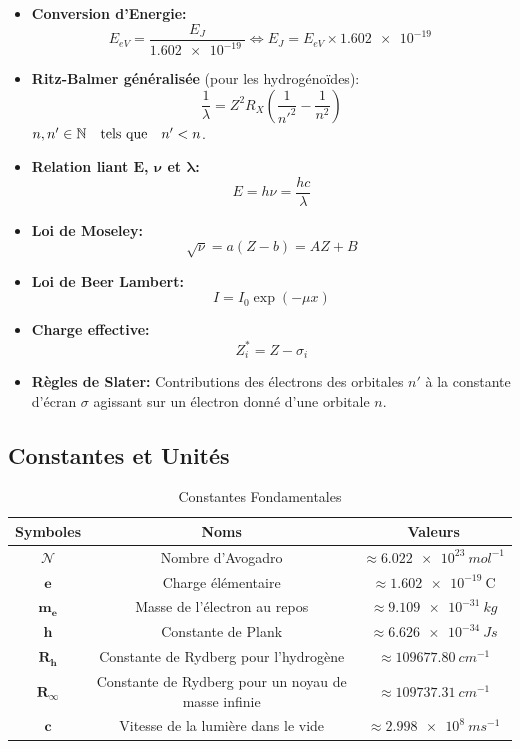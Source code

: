 \documentclass{article}
\begin{document}
\begin{itemize}[label=$\ast$]
    \item \textbf{Conversion d'Energie:}
    $$E_{eV}=\frac{E_J}{\qty{1.602e-19}{}} \Longleftrightarrow E_J=E_{eV}\times \qty{1.602e-19}{}$$

    \item \textbf{Ritz-Balmer généralisée} (pour les hydrogénoïdes):
    $$\frac{1}{\lambda} = Z^2R_X \left(\frac{1}{n'^2}-\frac{1}{n^2}\right)$$
\hfill $n,n'\in \mathbb{N} \text{\quad tels que\quad} n'<n$.

\item \textbf{Relation liant $\bm{E}$, $\bm{\nu}$ et $\bm{\lambda}$:} $$E=h\nu=\frac{hc}{\lambda}$$ 

\item \textbf{Loi de Moseley:} $$\sqrt{\nu}=a(Z-b)=AZ+B$$

\item \textbf{Loi de Beer Lambert:} $$I=I_0 \exp{(-\mu x)}$$

\item \textbf{Charge effective:} $$Z^*_i=Z-\sigma_i$$

\item \textbf{Règles de Slater:} \newline
Contributions des électrons des orbitales $n'$ à la constante d'écran $\sigma$  agissant sur un électron donné d'une orbitale $n$.
\vspace{5mm}
\resttable %

\end{itemize}


\subsection{Constantes et Unités}

\begin{table}[h]
\centering
    \begin{tabular}{|c|c|c|}
    \hline
        \textbf{Symboles} & \textbf{Noms} & \textbf{Valeurs} \\ \hline
        $\mathcal{N}$ & Nombre d'Avogadro & $\approx \qty{6.022e23}{mol^{-1}}$ \\ \hline
        $\bm{e}$ & Charge élémentaire & $\approx \qty{1.602e-19}{\coulomb}$ \\ \hline
        $\bm{m_e}$ & Masse de l'électron au repos & $\approx \qty{9.109e-31}{kg}$ \\ \hline
        $\bm{h}$ & Constante de Plank & $\approx \qty{6.626e-34}{Js}$ \\ \hline
        $\bm{R_h}$ & Constante de Rydberg pour l'hydrogène & $\approx \qty{109677.80}{cm^{-1}}$ \\ \hline
        $\bm{R_\infty}$ & Constante de Rydberg pour un noyau de masse infinie & $\approx \qty{109737.31}{cm^{-1}}$ \\ \hline
        $\bm{c}$ & Vitesse de la lumière dans le vide & $\approx \qty{2.998e8}{ms^{-1}}$ \\ \hline    
    \end{tabular}
    \caption{Constantes Fondamentales}
    \label{tab:Constantes Fondamentales}
\end{table}    
\end{document}
